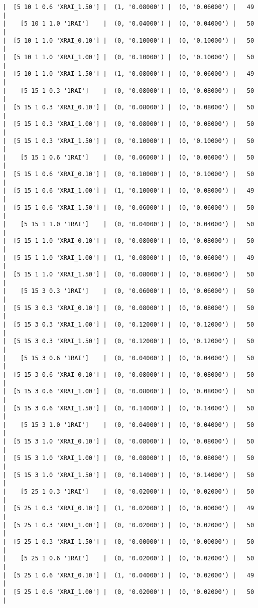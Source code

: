 \documentclass{article}
\begin{document}
\begin{verbatim}
|  [5 10 1 0.6 'XRAI_1.50'] |  (1, '0.08000') |  (0, '0.06000') |   49  |
|    [5 10 1 1.0 '1RAI']    |  (0, '0.04000') |  (0, '0.04000') |   50  |
|  [5 10 1 1.0 'XRAI_0.10'] |  (0, '0.10000') |  (0, '0.10000') |   50  |
|  [5 10 1 1.0 'XRAI_1.00'] |  (0, '0.10000') |  (0, '0.10000') |   50  |
|  [5 10 1 1.0 'XRAI_1.50'] |  (1, '0.08000') |  (0, '0.06000') |   49  |
|    [5 15 1 0.3 '1RAI']    |  (0, '0.08000') |  (0, '0.08000') |   50  |
|  [5 15 1 0.3 'XRAI_0.10'] |  (0, '0.08000') |  (0, '0.08000') |   50  |
|  [5 15 1 0.3 'XRAI_1.00'] |  (0, '0.08000') |  (0, '0.08000') |   50  |
|  [5 15 1 0.3 'XRAI_1.50'] |  (0, '0.10000') |  (0, '0.10000') |   50  |
|    [5 15 1 0.6 '1RAI']    |  (0, '0.06000') |  (0, '0.06000') |   50  |
|  [5 15 1 0.6 'XRAI_0.10'] |  (0, '0.10000') |  (0, '0.10000') |   50  |
|  [5 15 1 0.6 'XRAI_1.00'] |  (1, '0.10000') |  (0, '0.08000') |   49  |
|  [5 15 1 0.6 'XRAI_1.50'] |  (0, '0.06000') |  (0, '0.06000') |   50  |
|    [5 15 1 1.0 '1RAI']    |  (0, '0.04000') |  (0, '0.04000') |   50  |
|  [5 15 1 1.0 'XRAI_0.10'] |  (0, '0.08000') |  (0, '0.08000') |   50  |
|  [5 15 1 1.0 'XRAI_1.00'] |  (1, '0.08000') |  (0, '0.06000') |   49  |
|  [5 15 1 1.0 'XRAI_1.50'] |  (0, '0.08000') |  (0, '0.08000') |   50  |
|    [5 15 3 0.3 '1RAI']    |  (0, '0.06000') |  (0, '0.06000') |   50  |
|  [5 15 3 0.3 'XRAI_0.10'] |  (0, '0.08000') |  (0, '0.08000') |   50  |
|  [5 15 3 0.3 'XRAI_1.00'] |  (0, '0.12000') |  (0, '0.12000') |   50  |
|  [5 15 3 0.3 'XRAI_1.50'] |  (0, '0.12000') |  (0, '0.12000') |   50  |
|    [5 15 3 0.6 '1RAI']    |  (0, '0.04000') |  (0, '0.04000') |   50  |
|  [5 15 3 0.6 'XRAI_0.10'] |  (0, '0.08000') |  (0, '0.08000') |   50  |
|  [5 15 3 0.6 'XRAI_1.00'] |  (0, '0.08000') |  (0, '0.08000') |   50  |
|  [5 15 3 0.6 'XRAI_1.50'] |  (0, '0.14000') |  (0, '0.14000') |   50  |
|    [5 15 3 1.0 '1RAI']    |  (0, '0.04000') |  (0, '0.04000') |   50  |
|  [5 15 3 1.0 'XRAI_0.10'] |  (0, '0.08000') |  (0, '0.08000') |   50  |
|  [5 15 3 1.0 'XRAI_1.00'] |  (0, '0.08000') |  (0, '0.08000') |   50  |
|  [5 15 3 1.0 'XRAI_1.50'] |  (0, '0.14000') |  (0, '0.14000') |   50  |
|    [5 25 1 0.3 '1RAI']    |  (0, '0.02000') |  (0, '0.02000') |   50  |
|  [5 25 1 0.3 'XRAI_0.10'] |  (1, '0.02000') |  (0, '0.00000') |   49  |
|  [5 25 1 0.3 'XRAI_1.00'] |  (0, '0.02000') |  (0, '0.02000') |   50  |
|  [5 25 1 0.3 'XRAI_1.50'] |  (0, '0.00000') |  (0, '0.00000') |   50  |
|    [5 25 1 0.6 '1RAI']    |  (0, '0.02000') |  (0, '0.02000') |   50  |
|  [5 25 1 0.6 'XRAI_0.10'] |  (1, '0.04000') |  (0, '0.02000') |   49  |
|  [5 25 1 0.6 'XRAI_1.00'] |  (0, '0.02000') |  (0, '0.02000') |   50  |

\end{verbatim}
\end{document}
